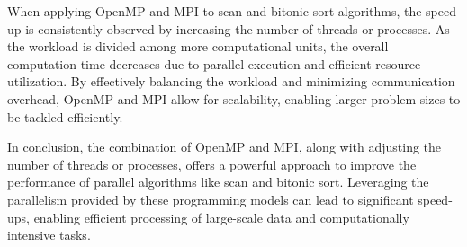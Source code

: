 When applying OpenMP and MPI to scan and bitonic sort algorithms, the speed-up is consistently observed by increasing the number of threads or processes. As the workload is divided among more computational units, the overall computation time decreases due to parallel execution and efficient resource utilization. By effectively balancing the workload and minimizing communication overhead, OpenMP and MPI allow for scalability, enabling larger problem sizes to be tackled efficiently.

In conclusion, the combination of OpenMP and MPI, along with adjusting the number of threads or processes, offers a powerful approach to improve the performance of parallel algorithms like scan and bitonic sort. Leveraging the parallelism provided by these programming models can lead to significant speed-ups, enabling efficient processing of large-scale data and computationally intensive tasks.

\newpage




 
